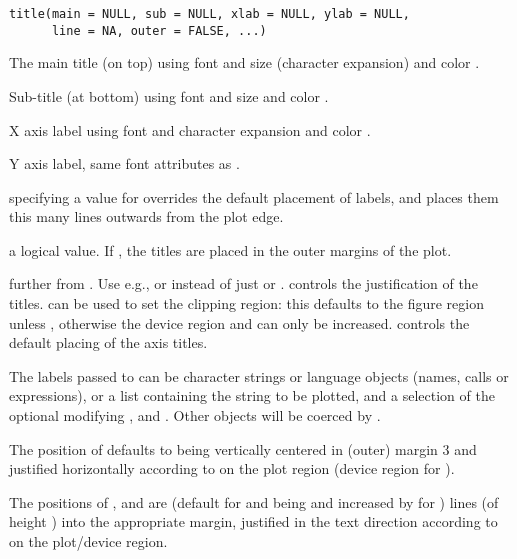 %
\begin{Usage}
\begin{verbatim}
title(main = NULL, sub = NULL, xlab = NULL, ylab = NULL,
      line = NA, outer = FALSE, ...)
\end{verbatim}
\end{Usage}
%
\begin{Arguments}
\begin{ldescription}
\item[\code{main}] The main title (on top) using font and size (character
expansion)  and color
.
\item[\code{sub}] Sub-title (at bottom) using font and size
 and color .
\item[\code{xlab}] X axis label using font and character expansion
 and color .
\item[\code{ylab}] Y axis label, same font attributes as .
\item[\code{line}] specifying a value for  overrides the
default placement of labels, and places them this many lines
outwards from the plot edge.
\item[\code{outer}] a logical value.  If , the titles are
placed in the outer margins of the plot.
\item[\code{...}] further  from .  Use
e.g.,  or  instead of just 
or .   controls the justification of the titles.
 can be used to set the clipping region:
this defaults to the figure region unless ,
otherwise the device region and can only be increased.  
controls the default placing of the axis titles.

\end{ldescription}
\end{Arguments}
%
\begin{Details}\relax
The labels passed to  can be character strings or
language objects (names, calls or expressions), or a list
containing the string to be plotted, and a selection of the optional
modifying  ,  and
.  Other objects will be coerced by
. 

The position of  defaults to being vertically centered in
(outer) margin 3 and justified horizontally according to
 on the plot region (device region for
).

The positions of ,  and  are
 (default for  and  being
 and increased by  for ) lines
(of height ) into the appropriate margin, justified
in the text direction according to  on the
plot/device region.
\end{Details}
